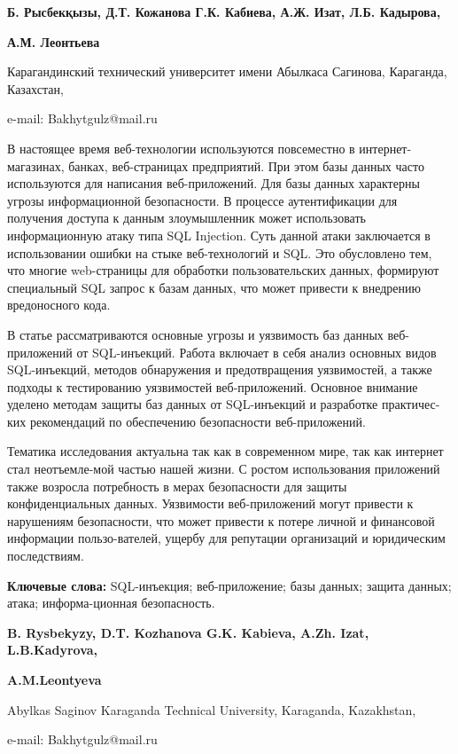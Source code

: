 \begin{center}
{\bfseries Б. Рысбекқызы\envelope, Д.Т. Кожанова Г.К. Кабиева,
А.Ж. Изат, Л.Б. Кадырова,}

{\bfseries А.М. Леонтьева}

Карагандинский технический университет имени Абылкаса Сагинова,
Караганда, Казахстан,

e-mail: Bakhytgulz@mail.ru
\end{center}

В настоящее время веб-технологии используются повсеместно в
интернет-магазинах, банках, веб-страницах предприятий. При этом базы
данных часто используются для написания веб-приложений. Для базы данных
характерны угрозы информационной безопасности. В процессе аутентификации
для получения доступа к данным злоумышленник может использовать
информационную атаку типа SQL Injection. Суть данной атаки заключается в
использовании ошибки на стыке веб-технологий и SQL. Это обусловлено тем,
что многие web-страницы для обработки пользовательских данных, формируют
специальный SQL запрос к базам данных, что может привести к внедрению
вредоносного кода.

В статье рассматриваются основные угрозы и уязвимость баз данных
веб-приложений от SQL-инъекций. Работа включает в себя анализ основных
видов SQL-инъекций, методов обнаружения и предотвращения уязвимостей, а
также подходы к тестированию уязвимостей веб-приложений. Основное
внимание уделено методам защиты баз данных от SQL-инъекций и разработке
практичес-ких рекомендаций по обеспечению безопасности веб-приложений.

Тематика исследования актуальна так как в современном мире, так как
интернет стал неотъемле-мой частью нашей жизни. С ростом использования
приложений также возросла потребность в мерах безопасности для защиты
конфиденциальных данных. Уязвимости веб-приложений могут привести к
нарушениям безопасности, что может привести к потере личной и финансовой
информации пользо-вателей, ущербу для репутации организаций и юридическим
последствиям.

{\bfseries Ключевые слова:} SQL-инъекция; веб-приложение; базы данных;
защита данных; атака; информа-ционная безопасность.


\begin{center}
{\bfseries B. Rysbekyzy\envelope, D.T. Kozhanova G.K. Kabieva,
A.Zh. Izat, L.B.Kadyrova,}

{\bfseries A.M.Leontyeva}

Abylkas Saginov Karaganda Technical University, Karaganda, Kazakhstan,

e-mail: Bakhytgulz@mail.ru
\end{center}

